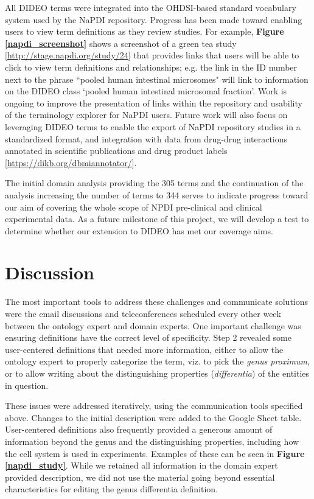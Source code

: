 \documentclass{bmcart}
\begin{document}
All DIDEO terms were integrated into the OHDSI-based standard vocabulary system used by the NaPDI repository.
Progress has been made toward enabling users to view term definitions as they review studies.
For example, \textbf{Figure \ref{napdi_screenshot}} shows a screenshot of a green tea study [\url{http://stage.napdi.org/study/24}] that provides links that users will be able to click to view term definitions and relationships; e.g. the link in the ID number next to the phrase ``pooled human intestinal microsomes" will link to information on the DIDEO class `pooled human intestinal microsomal fraction'.
Work is ongoing to improve the presentation of links within the repository and usability of the terminology explorer for NaPDI users.
Future work will also focus on leveraging DIDEO terms to enable the export of NaPDI repository studies in a standardized format, and integration with data from drug-drug interactions annotated in scientific publications and drug product labels [\url{https://dikb.org/dbmiannotator/}].

The initial domain analysis providing the 305 terms and the continuation of the analysis increasing the number of terms to 344 serves to indicate progress toward our aim of covering the whole scope of NPDI pre-clinical and clinical experimental data. As a future milestone of this project, we will develop a test to determine whether our extension to DIDEO has met our coverage aims.

\section*{Discussion}
The most important tools to address these challenges and communicate solutions were the email discussions and teleconferences scheduled every other week between the ontology expert and domain experts.
One important challenge was ensuring definitions have the correct level of specificity.
Step 2 revealed some user-centered definitions that needed more information, either to allow the ontology expert to properly categorize the term, viz. to  pick the \textit{genus proximum}, or to allow writing about the distinguishing properties (\textit{differentia}) of the entities in question.

These issues were addressed iteratively, using the communication tools specified above.
Changes to the initial description were added to the Google Sheet table.
User-centered definitions also frequently provided a generous amount of information beyond the genus and the distinguishing properties, including how the cell system is used in experiments.
Examples of these can be seen in \textbf{Figure \ref{napdi_study}}.
While we retained all information in the domain expert provided description, we did not use the material going beyond essential characteristics for editing the genus differentia definition.
\end{document}
